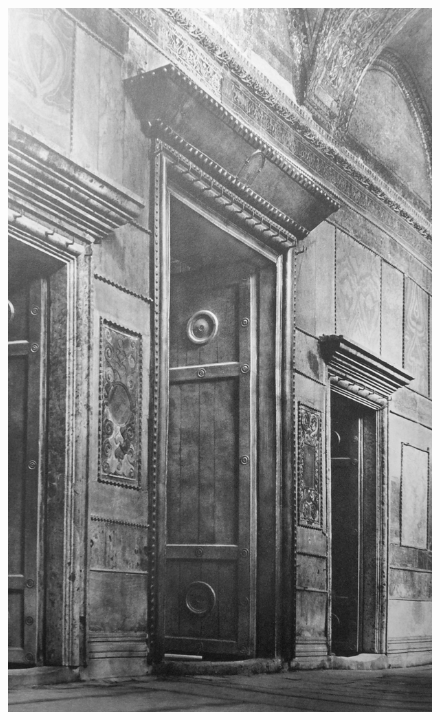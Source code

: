 \documentclass[amsthm,ebook]{saparticle}
\begin{document}
\begin{figure}[!bp]
\centering
 \includegraphics[width=\columnwidth]{FelleVisualFeaturesofinscriptionsEAGLE2016FullPaper-img012.jpg}

\end{figure}
\end{document}
